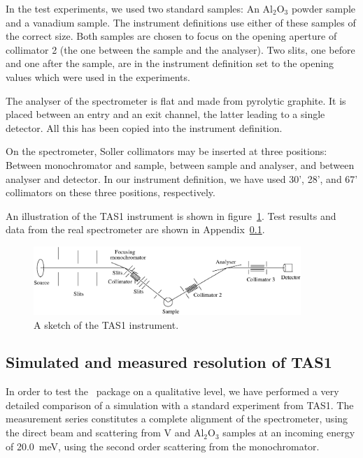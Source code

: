 In the test experiments, we used two standard samples:
An Al$_2$O$_3$ powder sample and a vanadium sample. The instrument
definitions use either of these samples of the correct
size. Both samples are chosen to focus on the opening aperture of
collimator 2 (the one between the sample and the analyser).
Two slits, one before and one after the sample,
are in the instrument definition set to the opening values which
were used in the experiments.

The analyser of the spectrometer is flat and made from
pyrolytic graphite. It is placed between an entry and
an exit channel, the latter leading to a single detector.
All this has been copied into the instrument definition.

On the spectrometer, Soller collimators may be inserted
at three positions: Between monochromator and sample,
between sample and analyser, and between analyser and detector.
In our instrument definition, we have used 30', 28', and 67' collimators
on these three positions, respectively.

An illustration of the TAS1 instrument
is shown in figure~\ref{f:TAS1}.
Test results and data from the real spectrometer are shown
in Appendix~\ref{data:TAS1}.

\begin{figure}
  \begin{center}
    \includegraphics[width=0.9\textwidth]{figures/tas1.eps}
  \end{center}
\caption{A sketch of the TAS1 instrument.}
\label{f:TAS1}
\end{figure}

\subsection{Simulated and measured resolution of TAS1}
\label{data:TAS1}

In order to test the \MCS\ package on a qualitative level,
we have performed a very detailed comparison of a simulation with a
standard experiment from TAS1. The measurement series
constitutes a complete alignment of the spectrometer,
using the direct beam and scattering from V and Al$_2$O$_3$
samples at an incoming energy of 20.0~meV, using the second order
scattering from the monochromator.

